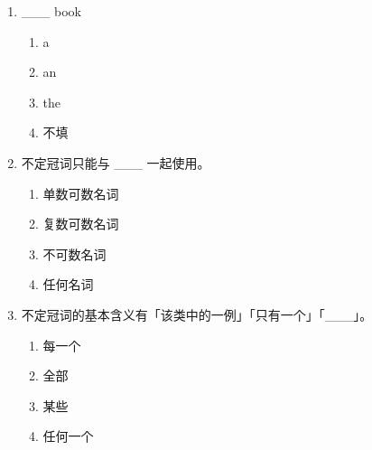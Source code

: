 \documentclass[11pt,a4paper]{ctexart}
\begin{document}
\begin{enumerate}[leftmargin=*,itemsep=4pt]
\item \_\_\_ book
\begin{enumerate}[label=\Alph*.,leftmargin=2em,itemsep=1pt,topsep=2pt]
\item a
\item an
\item the
\item 不填
\end{enumerate}
\item 不定冠词只能与 \_\_\_ 一起使用。
\begin{enumerate}[label=\Alph*.,leftmargin=2em,itemsep=1pt,topsep=2pt]
\item 单数可数名词
\item 复数可数名词
\item 不可数名词
\item 任何名词
\end{enumerate}
\item 不定冠词的基本含义有「该类中的一例」「只有一个」「\_\_\_」。
\begin{enumerate}[label=\Alph*.,leftmargin=2em,itemsep=1pt,topsep=2pt]
\item 每一个
\item 全部
\item 某些
\item 任何一个
\end{enumerate}
\end{enumerate}
\end{document}
